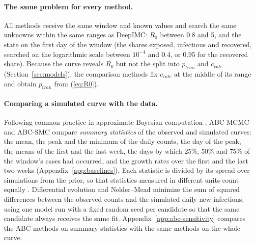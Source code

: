 \documentclass[12pt]{article}
\begin{document}
\paragraph{The same problem for every method.} All methods receive the same window and known values
and search the same unknowns within the same ranges as DeepIMC: $R_0$ between 0.8 and 5, and the
state on the first day of the window (the shares exposed, infectious and recovered, searched on the
logarithmic scale between $10^{-4}$ and 0.4, or 0.95 for the recovered share). Because the curve
reveals $R_0$ but not the split into $p_{tran}$ and $c_{rate}$ (Section~\ref{sec:models}), the
comparison methods fix $c_{rate}$ at the middle of its range and obtain $p_{tran}$ from (\ref{eq:R0}).

\paragraph{Comparing a simulated curve with the data.} Following common practice in approximate
Bayesian computation \autocite{beaumont2002approximate}, ABC-MCMC and ABC-SMC compare \emph{summary
statistics} of the observed and simulated curves: the mean, the peak and the minimum of the daily
counts, the day of the peak, the means of the first and the last week, the days by which 25\%, 50\%
and 75\% of the window's cases had occurred, and the growth rates over the first and the last two
weeks (Appendix~\ref{app:baselines}). Each statistic is divided by its spread over simulations from
the prior, so that statistics measured in different units count equally
\autocite{prangle2017adapting}. Differential evolution and Nelder--Mead minimize the sum of squared
differences between the observed counts and the simulated daily new infections, using one model run
with a fixed random seed per candidate so that the same candidate always receives the same fit.
Appendix~\ref{app:abc-sensitivity} compares the ABC methods on summary statistics with the same
methods on the whole curve.
\end{document}
